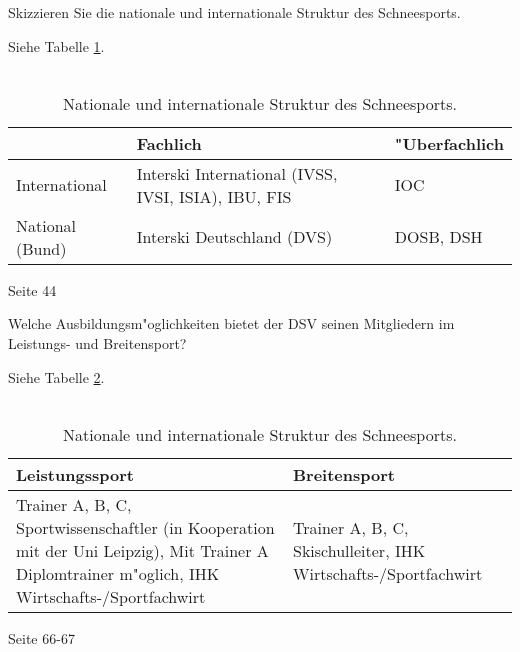 \begin{question}{4}
Skizzieren Sie die nationale und internationale Struktur des Schneesports.
\end{question}
\begin{solution}
Siehe Tabelle \ref{strukturschneesport}.\\\\
\begin{table}
\caption{Nationale und internationale Struktur des Schneesports.}
  \label{strukturschneesport}
  \scriptsize
  \begin{center}
    \begin{tabular}{p{}|p{}|p{}}
       & \textbf{Fachlich} & \textbf{"Uberfachlich}\\
    \hline
      International & Interski International (IVSS, IVSI, ISIA), IBU, FIS & IOC\\
      National (Bund) & Interski Deutschland (DVS) & DOSB, DSH
    \end{tabular}
  \end{center}
\end{table}
 Seite 44
\end{solution}

\begin{question}{4}
Welche Ausbildungsm"oglichkeiten bietet der DSV seinen Mitgliedern im Leistungs- und Breitensport?
\end{question}
\begin{solution}
Siehe Tabelle \ref{ausbildungen}.\\\\
\begin{table}
\caption{Nationale und internationale Struktur des Schneesports.}
  \label{ausbildungen}
  \scriptsize
  \begin{center}
    \begin{tabular}{p{}|p{}}
       \textbf{Leistungssport} & \textbf{Breitensport}\\
    \hline
      Trainer A, B, C, Sportwissenschaftler (in Kooperation mit der Uni Leipzig), Mit Trainer A Diplomtrainer m"oglich, IHK Wirtschafts-/Sportfachwirt & Trainer A, B, C, Skischulleiter, IHK Wirtschafts-/Sportfachwirt
    \end{tabular}
  \end{center}
\end{table}
 Seite 66-67
\end{solution}

